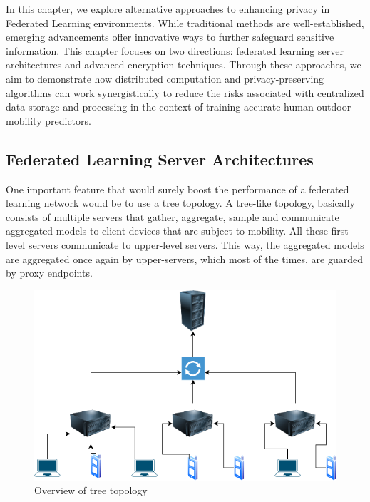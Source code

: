 \documentclass[conference]{IEEEtran}
\begin{document}
In this chapter, we explore alternative approaches to enhancing privacy in Federated Learning environments. While traditional methods are well-established, emerging advancements offer innovative ways to further safeguard sensitive information. This chapter focuses on two directions: federated learning server architectures and advanced encryption techniques. Through these approaches, we aim to demonstrate how distributed computation and privacy-preserving algorithms can work synergistically to reduce the risks associated with centralized data storage and processing in the context of training accurate human outdoor mobility predictors.

\subsection{Federated Learning Server Architectures}

One important feature that would surely boost the performance of a federated learning network would be to use a tree topology. A tree-like topology, basically consists of multiple servers that gather, aggregate, sample and communicate aggregated models to client devices that are subject to mobility. All these first-level servers communicate to upper-level servers. This way, the aggregated models are aggregated once again by upper-servers, which most of the times, are guarded by proxy endpoints.

\begin{figure}[htbp]
\centerline{\includegraphics[scale=0.3]{tree_architecture.drawio.png}}
\caption{Overview of tree topology}
\label{fig}
\end{figure}
\end{document}
